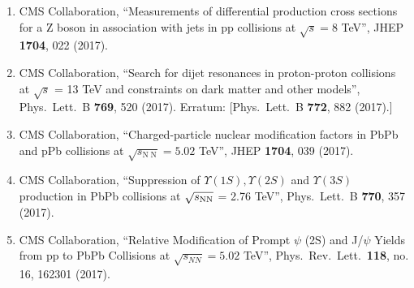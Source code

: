 \begin{itemize}
\begin{enumerate}
\item CMS Collaboration, ``Measurements of differential production cross sections for a Z boson in association with jets in pp collisions at $ \sqrt{s}=8 $ TeV'', JHEP {\bf 1704}, 022 (2017).

\item CMS Collaboration, ``Search for dijet resonances in proton-proton collisions at $\sqrt{s}$ = 13 TeV and constraints on dark matter and other models'', Phys.\ Lett.\ B {\bf 769}, 520 (2017).
  Erratum: [Phys.\ Lett.\ B {\bf 772}, 882 (2017).]

\item CMS Collaboration, ``Charged-particle nuclear modification factors in PbPb and pPb collisions at $ \sqrt{s_{\mathrm{N}\;\mathrm{N}}}=5.02 $ TeV'', JHEP {\bf 1704}, 039 (2017).

\item CMS Collaboration, ``Suppression of $\Upsilon(1S), \Upsilon(2S)$ and $\Upsilon(3S)$ production in PbPb collisions at $\sqrt{s_{\rm NN}}$ = 2.76 TeV'', Phys.\ Lett.\ B {\bf 770}, 357 (2017).

\item CMS Collaboration, ``Relative Modification of Prompt $\psi$ (2S) and J/$\psi$ Yields from pp to PbPb Collisions at $\sqrt{s_{NN}}=5.02$ TeV'', Phys.\ Rev.\ Lett.\  {\bf 118}, no. 16, 162301 (2017).


\end{enumerate}
\end{itemize}
